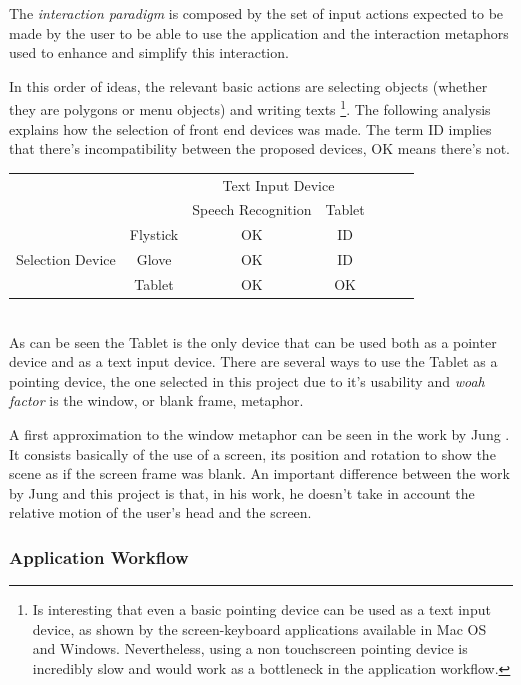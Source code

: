 The \emph{interaction paradigm} is composed by the set of input actions expected to be made by the user to be able to use the application and the interaction metaphors used to enhance and simplify this interaction.

In this order of ideas, the relevant basic actions are selecting objects (whether they are polygons or menu objects) and writing texts \footnote{Is interesting that even a basic pointing device can be used as a text input device, as shown by the screen-keyboard applications available in Mac OS and Windows. Nevertheless, using a non touchscreen pointing device is incredibly slow and would work as a bottleneck in the application workflow.}. The following analysis explains how the selection of front end devices was made. The term ID implies that there's incompatibility between the proposed devices, OK means there's not.

\begin{tabular}{cc|c|c|c|c|l}
\cline{3-4}
& & \multicolumn{2}{|c|}{Text Input Device} \\ \cline{3-4}
& & Speech Recognition & Tablet \\ \cline{1-4}
\multicolumn{1}{|c|}{\multirow{3}{*}{Selection Device}} &
\multicolumn{1}{|c|}{Flystick}& OK & ID     \\ \cline{2-4}
\multicolumn{1}{|c|}{}                        &
\multicolumn{1}{|c|}{Glove} & OK & ID     \\ \cline{2-4}
\multicolumn{1}{|c|}{}                        &
\multicolumn{1}{|c|}{Tablet} & OK & OK \\ \cline{1-4}
\end{tabular}\\

As can be seen the Tablet is the only device that can be used both as a pointer device and as a text input device. There are several ways to use the Tablet as a pointing device, the one selected in this project due to it's usability and \emph{woah factor} is the window, or blank frame, metaphor. 

A first approximation to the window metaphor can be seen in the work by Jung \cite{Jung}. It consists basically of the use of a screen, its position and rotation to show the scene as if the screen frame was blank. An important difference between the work by Jung and this project is that, in his work, he doesn't take in account the relative motion of the user's head and the screen.


\subsubsection{Application Workflow}

